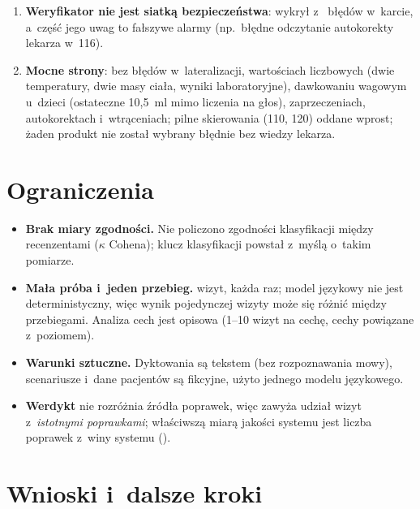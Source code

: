 \documentclass[11pt,a4paper]{article}
\begin{document}
\begin{enumerate}[label=U\arabic*.]
        kontynuacja leku poza receptą) nie trafiają do zaleceń dla pacjenta.
  \item \textbf{Weryfikator nie jest siatką bezpieczeństwa}: wykrył \nStageTwoSystemByVerifier{} z~\nStageTwoSystem{} błędów
        w~karcie, a~część jego uwag to fałszywe alarmy (np.\ błędne odczytanie autokorekty lekarza w~116).
  \item \textbf{Mocne strony}: bez błędów w~lateralizacji, wartościach liczbowych (dwie temperatury, dwie masy ciała, wyniki
        laboratoryjne), dawkowaniu wagowym u~dzieci (ostateczne 10,5~ml mimo liczenia na głos), zaprzeczeniach, autokorektach
        i~wtrąceniach; pilne skierowania (110, 120) oddane wprost; żaden produkt nie został wybrany błędnie bez wiedzy lekarza.
\end{enumerate}

\section{Ograniczenia}

\begin{itemize}
  \item \textbf{Brak miary zgodności.} Nie policzono zgodności klasyfikacji między recenzentami ($\kappa$ Cohena);
        klucz klasyfikacji powstał z~myślą o~takim pomiarze.
  \item \textbf{Mała próba i~jeden przebieg.} \nVisits{} wizyt, każda raz; model językowy nie jest deterministyczny,
        więc wynik pojedynczej wizyty może się różnić między przebiegami. Analiza cech jest opisowa (1--10 wizyt na cechę, cechy powiązane z~poziomem).
  \item \textbf{Warunki sztuczne.} Dyktowania są tekstem (bez rozpoznawania mowy), scenariusze i~dane pacjentów są fikcyjne,
        użyto jednego modelu językowego.
  \item \textbf{Werdykt} nie rozróżnia źródła poprawek, więc zawyża udział wizyt z~\emph{istotnymi poprawkami};
        właściwszą miarą jakości systemu jest liczba poprawek z~winy systemu (\nSrcSystem{}).
\end{itemize}

\section{Wnioski i~dalsze kroki}
\end{document}
